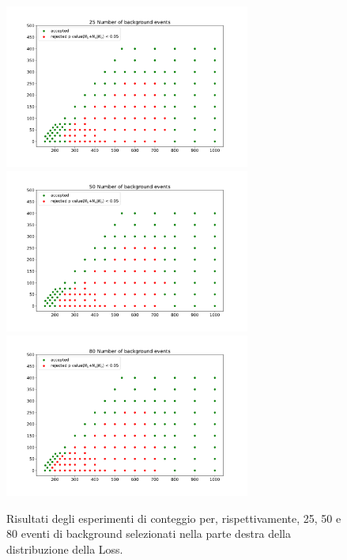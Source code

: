 \newpage

\begin{figure}[h!]
	\centering
	\includegraphics[width=0.72\textwidth]{figs/risultati_simulazione/25.pdf}
	\includegraphics[width=0.72\textwidth]{figs/risultati_simulazione/50.pdf}
	\includegraphics[width=0.72\textwidth]{figs/risultati_simulazione/80.pdf}
	\caption{Risultati degli esperimenti di conteggio per, rispettivamente, 25, 50 e 80 eventi di background selezionati nella parte destra della distribuzione della Loss.}
	\label{test-25-50-80}
\end{figure}
